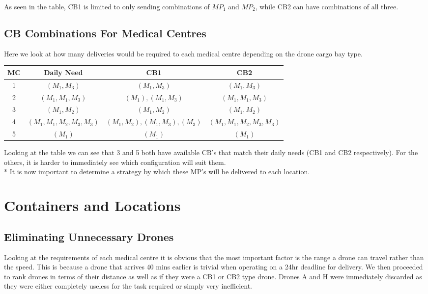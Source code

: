 \documentclass[a4paper,12pt]{article}
\begin{document}
As seen in the table, CB1 is limited to only sending combinations of $MP_1$ and $MP_2$, while CB2 can have combinations of all three.

\subsection{CB Combinations For Medical Centres}
Here we look at how many deliveries would be required to each medical centre depending on the drone cargo bay type.
\begin{center}
\begin{tabular}{ |c|c|c|c| }
 \hline
 MC & Daily Need & CB1 & CB2 \\\hline
  1 & $(M_1,M_3)$ & $(M_1,M_3)$ & $(M_1,M_3)$  \\
  2 & $(M_1,M_1,M_3)$ & $(M_1),(M_1,M_3)$ & $(M_1,M_1,M_3)$  \\
  3 & $(M_1,M_2)$ & $(M_1,M_2)$ & $ (M_1,M_2)$  \\
  4 & $(M_1,M_1,M_2,M_3,M_3)$ & $(M_1,M_2),(M_1,M_3),(M_3)$ & $(M_1,M_1,M_2,M_3,M_3)$  \\
  5 & $(M_1)$ & $(M_1)$ & $(M_1)$  \\
\hline
\end{tabular}
\end{center}
Looking at the table we can see that 3 and 5 both have available CB's that match their daily needs (CB1 and CB2 respectively).
For the others, it is harder to immediately see which configuration will suit them.\\*
It is now important to determine a strategy by which these MP's will be delivered to each location.

\section{Containers and Locations}
\subsection{Eliminating Unnecessary Drones}
Looking at the requirements of each medical centre it is obvious that the most important factor is the range a drone can travel rather than the speed.
This is because a drone that arrives 40 mins earlier is trivial when operating on a 24hr deadline for delivery.
We then proceeded to rank drones in terms of their distance as well as if they were a CB1 or CB2 type drone.
Drones A and H were immediately discarded as they were either completely useless for the task required or simply very inefficient.
\end{document}
